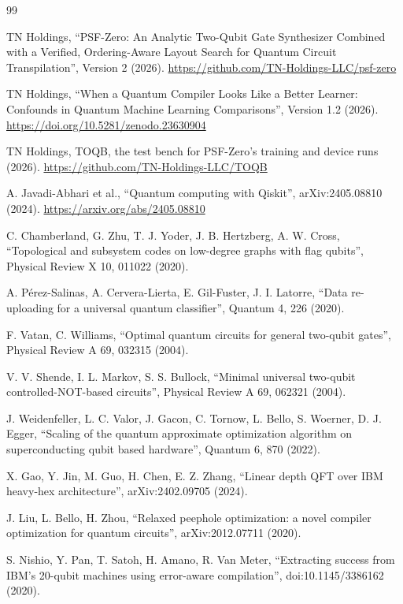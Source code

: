 \documentclass[11pt]{article}
\begin{document}
\begin{thebibliography}{99}

 TN Holdings, ``PSF-Zero: An Analytic Two-Qubit Gate Synthesizer Combined with a Verified,
Ordering-Aware Layout Search for Quantum Circuit Transpilation'', Version 2 (2026).
\url{https://github.com/TN-Holdings-LLC/psf-zero}

 TN Holdings, ``When a Quantum Compiler Looks Like a Better Learner: Confounds in Quantum Machine
Learning Comparisons'', Version 1.2 (2026). \url{https://doi.org/10.5281/zenodo.23630904}

 TN Holdings, TOQB, the test bench for PSF-Zero's training and device runs (2026).
\url{https://github.com/TN-Holdings-LLC/TOQB}

 A. Javadi-Abhari et al., ``Quantum computing with Qiskit'', arXiv:2405.08810 (2024).
\url{https://arxiv.org/abs/2405.08810}

 C. Chamberland, G. Zhu, T. J. Yoder, J. B. Hertzberg, A. W. Cross, ``Topological and
subsystem codes on low-degree graphs with flag qubits'', Physical Review X 10, 011022 (2020).

 A. P\'erez-Salinas, A. Cervera-Lierta, E. Gil-Fuster, J. I. Latorre, ``Data re-uploading for a
universal quantum classifier'', Quantum 4, 226 (2020).

 F. Vatan, C. Williams, ``Optimal quantum circuits for general two-qubit gates'', Physical Review A
69, 032315 (2004).

 V. V. Shende, I. L. Markov, S. S. Bullock, ``Minimal universal two-qubit controlled-NOT-based
circuits'', Physical Review A 69, 062321 (2004).

 J. Weidenfeller, L. C. Valor, J. Gacon, C. Tornow, L. Bello, S. Woerner, D. J. Egger,
``Scaling of the quantum approximate optimization algorithm on superconducting qubit based hardware'', Quantum 6, 870
(2022).

 X. Gao, Y. Jin, M. Guo, H. Chen, E. Z. Zhang, ``Linear depth QFT over IBM heavy-hex architecture'',
arXiv:2402.09705 (2024).

 J. Liu, L. Bello, H. Zhou, ``Relaxed peephole optimization: a novel compiler optimization for
quantum circuits'', arXiv:2012.07711 (2020).

 S. Nishio, Y. Pan, T. Satoh, H. Amano, R. Van Meter, ``Extracting success from IBM's 20-qubit
machines using error-aware compilation'', doi:10.1145/3386162 (2020).


\end{thebibliography}
\end{document}
